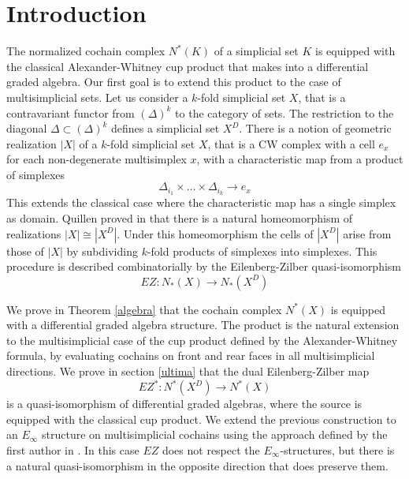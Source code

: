 
\section{Introduction} \label{s:introduction} 

The normalized cochain complex $N^*(K)$ of a simplicial set $K$ is equipped with the classical Alexander-Whitney cup product that makes into a differential graded algebra.
Our first goal is to extend this product to the case of multisimplicial sets.
Let us consider a $k$-fold simplicial set $X$, that is a contravariant functor from $(\Delta)^k$ to the category of sets.
The restriction to the diagonal $\Delta \subset (\Delta)^k$ defines a simplicial set $X^D$.
There is a notion of geometric realization $|X|$ of a $k$-fold simplicial set $X$, that is a CW complex with a cell $e_x$ for each non-degenerate multisimplex $x$, with a characteristic map from a product of simplexes $$\Delta_{i_1} \times \dots \times \Delta_{i_k} \to e_x$$ This extends the classical case where the characteristic map has a single simplex as domain.
Quillen proved in \cite{Quillen} that there is a natural homeomorphism of realizations $|X| \cong |X^D|$.
Under this homeomorphism the cells of $|X^D|$ arise from those of $|X|$ by subdividing $k$-fold products of simplexes into simplexes.
This procedure is described combinatorially by the Eilenberg-Zilber quasi-isomorphism
$$EZ:N_*(X) \to N_*(X^D)$$


\medskip

We prove in Theorem \ref{algebra} %
that the cochain complex $N^*(X)$ is equipped with a differential graded algebra structure.
The product is the natural extension to the multisimplicial case of the cup product defined by the Alexander-Whitney formula, by
evaluating cochains on front and rear faces in all multisimplicial directions.
We prove in section \ref{ultima} that the dual Eilenberg-Zilber map
$$EZ^*:N^*(X^D) \to N^*(X)$$ %
 is a quasi-isomorphism of differential graded algebras, where the source is equipped with the classical cup product.
We extend the previous construction to an $E_\infty$ structure on multisimplicial cochains using the approach defined by the first author in \cite{anibal}.
In this case $EZ$ does not respect the $E_\infty$-structures, but there is a natural quasi-isomorphism in the opposite direction that does preserve them.

